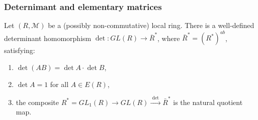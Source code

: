 \subsubsection{Deternimant and elementary matrices}

\begin{theo}
Let $(R, \mathcal{M})$ be a (possibly non-commutative) local ring. There is a well-defined determinant homomorphism $\det: GL(R) \rightarrow \overline{R}^*$, where $\bar{R}^*=\left(R^*\right)^{a b}$, satisfying:
\begin{enumerate}
    \item $\operatorname{det}(A B)=\operatorname{det} A \cdot \operatorname{det} B$,
    \item $\operatorname{det} A=1$ for all $A \in E(R)$,
    \item the composite $R^*=G L_1(R) \longrightarrow G L(R) \xrightarrow{\text { det }} \bar{R}^*$ is the natural quotient map.
\end{enumerate}
\end{theo}

